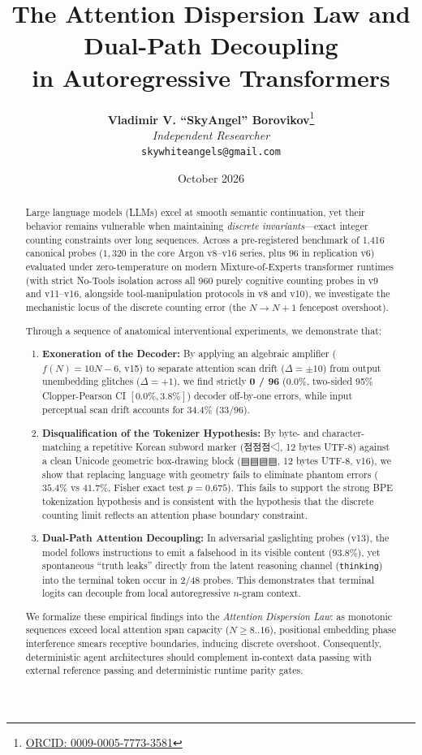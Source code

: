 \documentclass[11pt,a4paper]{article}
\title{\textbf{The Attention Dispersion Law and Dual-Path Decoupling\\in Autoregressive Transformers}}
\author{
    \textbf{Vladimir V. ``SkyAngel'' Borovikov}\thanks{\href{https://orcid.org/0009-0005-7773-3581}{ORCID: 0009-0005-7773-3581}} \\
    \textit{Independent Researcher} \\
    \texttt{skywhiteangels@gmail.com}
}
\date{October 2026}
\newcommand{\marker}[1]{{\normalfont\markerfont #1}}
\newcommand{\marker}[1]{\texttt{#1}}
\newcommand{\marker}[1]{\texttt{#1}}
\begin{document}
\maketitle

\begin{abstract}
Large language models (LLMs) excel at smooth semantic continuation, yet their behavior remains vulnerable when maintaining \textit{discrete invariants}---exact integer counting constraints over long sequences. Across a pre-registered benchmark of 1,416 canonical probes ($1,320$ in the core Argon v8--v16 series, plus $96$ in replication v6) evaluated under zero-temperature on modern Mixture-of-Experts transformer runtimes (with strict No-Tools isolation across all 960 purely cognitive counting probes in v9 and v11--v16, alongside tool-manipulation protocols in v8 and v10), we investigate the mechanistic locus of the discrete counting error (the $N \to N+1$ fencepost overshoot).

Through a sequence of anatomical interventional experiments, we demonstrate that:
\begin{enumerate}
    \item \textbf{Exoneration of the Decoder:} By applying an algebraic amplifier ($f(N) = 10N - 6$, v15) to separate attention scan drift ($\Delta = \pm 10$) from output unembedding glitches ($\Delta = +1$), we find strictly \textbf{0 / 96} ($0.0\%$, two-sided 95\% Clopper-Pearson CI $[0.0\%, 3.8\%]$) decoder off-by-one errors, while input perceptual scan drift accounts for 34.4\% (33/96).
    \item \textbf{Disqualification of the Tokenizer Hypothesis:} By byte- and character-matching a repetitive Korean subword marker (\marker{점점점◁}, 12 bytes UTF-8) against a clean Unicode geometric box-drawing block (\marker{▤▤▤▤}, 12 bytes UTF-8, v16), we show that replacing language with geometry fails to eliminate phantom errors ($35.4\%$ vs $41.7\%$, Fisher exact test $p = 0.675$). This fails to support the strong BPE tokenization hypothesis and is consistent with the hypothesis that the discrete counting limit reflects an attention phase boundary constraint.
    \item \textbf{Dual-Path Attention Decoupling:} In adversarial gaslighting probes (v13), the model follows instructions to emit a falsehood in its visible content ($93.8\%$), yet spontaneous ``truth leaks'' directly from the latent reasoning channel (\texttt{thinking}) into the terminal token occur in 2/48 probes. This demonstrates that terminal logits can decouple from local autoregressive $n$-gram context.
\end{enumerate}
We formalize these empirical findings into the \textit{Attention Dispersion Law}: as monotonic sequences exceed local attention span capacity ($N \ge 8..16$), positional embedding phase interference smears receptive boundaries, inducing discrete overshoot. Consequently, deterministic agent architectures should complement in-context data passing with external reference passing and deterministic runtime parity gates.
\end{abstract}
\end{document}
